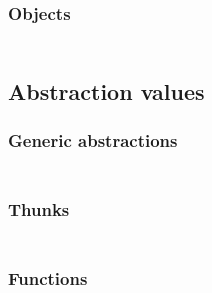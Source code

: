 \subsubsection{Objects}\hypertarget{objects}{}\label{objects}

\begin{align*}
  [ \
  \KEY{Datatype} \quad & \NAMEHYPER{../../../../../Funcons-beta/Values/Composite}{Objects}{objects} \\
  \KEY{Funcon} \quad & \NAMEHYPER{../../../../../Funcons-beta/Values/Composite}{Objects}{object} \\
  \KEY{Funcon} \quad & \NAMEHYPER{../../../../../Funcons-beta/Values/Composite}{Objects}{object-class-name} \\
  \KEY{Funcon} \quad & \NAMEHYPER{../../../../../Funcons-beta/Values/Composite}{Objects}{object-single-inheritance-feature-map}
  \ ]
\end{align*}
\subsection{Abstraction values}\hypertarget{abstraction-values}{}\label{abstraction-values}

\subsubsection{Generic abstractions}\hypertarget{generic-abstractions}{}\label{generic-abstractions}

\begin{align*}
  [ \
  \KEY{Funcon} \quad & \NAMEHYPER{../../../../../Funcons-beta/Values/Abstraction}{Generic}{abstraction} \\
  \KEY{Funcon} \quad & \NAMEHYPER{../../../../../Funcons-beta/Values/Abstraction}{Generic}{closure}
  \ ]
\end{align*}
\subsubsection{Thunks}\hypertarget{thunks}{}\label{thunks}

\begin{align*}
  [ \
  \KEY{Funcon} \quad & \NAMEHYPER{../../../../../Funcons-beta/Values/Abstraction}{Thunks}{thunk} \\
  \KEY{Funcon} \quad & \NAMEHYPER{../../../../../Funcons-beta/Values/Abstraction}{Thunks}{force}
  \ ]
\end{align*}
\subsubsection{Functions}\hypertarget{functions}{}\label{functions}

